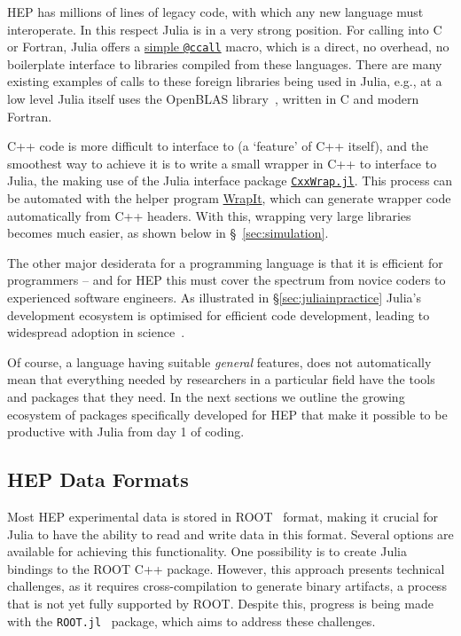 \documentclass{webofc}
\begin{document}
HEP has millions of lines of legacy code, with which any new language must
interoperate. In this respect Julia is in a very strong position. For calling
into C or Fortran, Julia offers a
\href{https://docs.julialang.org/en/v1/manual/calling-c-and-fortran-code/}{simple
\texttt{@ccall}} macro, which is a direct, no overhead, no boilerplate interface
to libraries compiled from these languages. There are many existing examples of
calls to these foreign libraries being used in Julia, e.g., at a low level Julia
itself uses the OpenBLAS library~\cite{6877458}, written in C and modern
Fortran. 


C++ code is more difficult to interface to (a `feature' of C++ itself), and the
smoothest way to achieve it is to write a small wrapper in C++ to interface to
Julia, the making use of the Julia interface package
\href{https://github.com/JuliaInterop/CxxWrap.jl}{\texttt{CxxWrap.jl}}. This
process can be automated with the helper program
\href{https://github.com/grasph/wrapit}{WrapIt}, which can generate wrapper code
automatically from C++ headers. With this, wrapping very large libraries becomes
much easier, as shown below in \S~\ref{sec:simulation}.

The other major desiderata for a programming language is that it is efficient
for programmers -- and for HEP this must cover the spectrum from novice coders
to experienced software engineers. As illustrated in \S\ref{sec:juliainpractice} Julia's development ecosystem is optimised for
efficient code development, leading to widespread adoption in
science~\cite{perkel-julia-science}.

Of course, a language having suitable \emph{general} features, does not
automatically mean that everything needed by researchers in a particular field
have the tools and packages that they need. In the next sections we outline the
growing ecosystem of packages specifically developed for HEP that make it
possible to be productive with Julia from day 1 of coding. 

\subsection{HEP Data Formats}
\label{sec:hepdataformats}

Most HEP experimental data is stored in ROOT~\cite{ROOT:2011zz} format, making
it crucial for Julia to have the ability to read and write data in this format.
Several options are available for achieving this functionality. One possibility
is to create Julia bindings to the ROOT C++ package. However, this approach
presents technical challenges, as it requires cross-compilation to generate
binary artifacts, a process that is not yet fully supported by ROOT. Despite
this, progress is being made with the \texttt{ROOT.jl}~\cite{ROOT_jl} package,
which aims to address these challenges.
\end{document}
